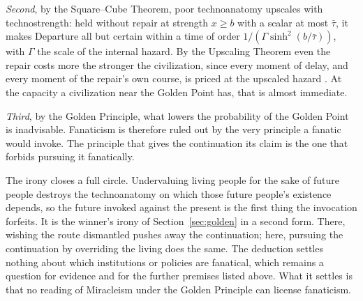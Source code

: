 \emph{Second}, by the Square--Cube Theorem, poor technoanatomy upscales with
technostrength: held without repair at strength $x\ge b$ with a scalar
at most $\bar\tau$, it makes Departure all but certain within a time of order
$1/(\Gamma\sinh^2(b/\bar\tau))$, with $\Gamma$ the scale of the internal hazard. By the
Upscaling Theorem even the repair costs more the stronger the civilization,
since every moment of delay, and every moment of the repair's own course, is
priced at the upscaled hazard \cite{GoldenTechnoanatomy}. At the capacity a
civilization near the Golden Point has, that is almost immediate.

\emph{Third}, by the Golden Principle, what lowers the probability of the
Golden Point is inadvisable. Fanaticism is therefore ruled out by the very
principle a fanatic would invoke. The principle that gives the continuation
its claim is the one that forbids pursuing it fanatically.

The irony closes a full circle. Undervaluing living people for the sake of
future people destroys the technoanatomy on which those future people's
existence depends, so the future invoked against the present is the first
thing the invocation forfeits. It is the winner's irony of
Section~\ref{sec:golden} in a second form. There, wishing the route
dismantled pushes away the continuation; here, pursuing the continuation by
overriding the living does the same. The deduction settles nothing about
which institutions or policies are fanatical, which remains a question for
evidence and for the further premises listed above. What it
settles is that no reading of Miracleism under the Golden Principle can
license fanaticism.


